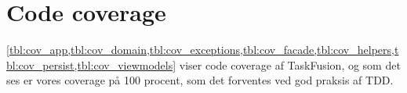 \section{Code coverage}\label{chap:code_coverage}
\cref{tbl:cov_app,tbl:cov_domain,tbl:cov_exceptions,tbl:cov_facade,tbl:cov_helpers,tbl:cov_persist,tbl:cov_viewmodels} viser code coverage af TaskFusion, og som det ses er vores coverage på 100 procent, som det forventes ved god praksis af TDD.
\begin{table}[H]
    \centering
    \caption{Coverage for applikationslaget}\label{tbl:cov_app}
\end{table}
